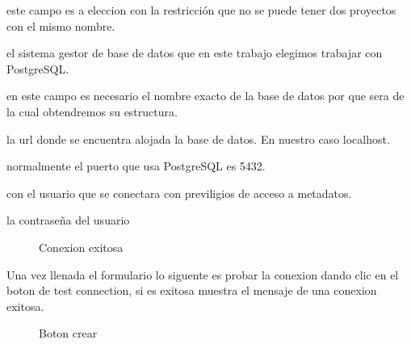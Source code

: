 \begin{description}[align=left]
\item [Nombre] este campo es a eleccion con la restricci\'on que no se puede tener dos proyectos con el mismo nombre.
\item [sgbd] el sistema gestor de base de datos que en este trabajo elegimos trabajar con PostgreSQL.
\item [base de datos] en este campo es necesario el nombre exacto de la base de datos por que sera de la cual obtendremos su estructura.
\item [host] la url donde se encuentra alojada la base de datos. En nuestro caso localhost.
\item [puerto] normalmente el puerto que usa PostgreSQL es 5432.
\item [usuario] con el usuario que se conectara con previligios de acceso a metadatos.
\item [password] la contrase\~na del usuario
\end{description}
\begin{figure}[H]

\caption{Conexion exitosa} \label{fig:connectionsuccessfull}
\centering
{}
\end{figure}
Una vez llenada el formulario lo siguente es probar la conexion dando clic en el boton de test connection, si es exitosa muestra el mensaje de una conexion exitosa. 
\begin{figure}[H]
\caption{Boton crear} \label{fig:createbutton}
\centering
{}
\end{figure}
